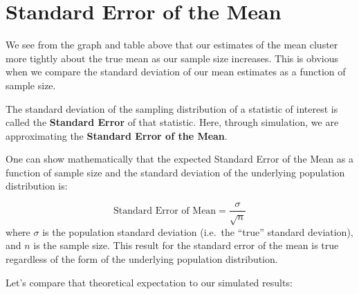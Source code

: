 \documentclass[]{book}
\newenvironment{Shaded}{\begin{snugshade}}{\end{snugshade}}
\newcommand{\CommentTok}[1]{\textcolor[rgb]{0.56,0.35,0.01}{\textit{#1}}}
\newcommand{\DataTypeTok}[1]{\textcolor[rgb]{0.13,0.29,0.53}{#1}}
\newcommand{\KeywordTok}[1]{\textcolor[rgb]{0.13,0.29,0.53}{\textbf{#1}}}
\newcommand{\NormalTok}[1]{#1}
\newcommand{\OperatorTok}[1]{\textcolor[rgb]{0.81,0.36,0.00}{\textbf{#1}}}
\newcommand{\StringTok}[1]{\textcolor[rgb]{0.31,0.60,0.02}{#1}}
\theoremstyle{definition}
\theoremstyle{definition}
\theoremstyle{definition}
\theoremstyle{remark}
\begin{document}
\begin{Shaded}
\end{Shaded}

\hypertarget{standard-error-of-the-mean}{%
\section{Standard Error of the Mean}\label{standard-error-of-the-mean}}

We see from the graph and table above that our estimates of the mean
cluster more tightly about the true mean as our sample size increases.
This is obvious when we compare the standard deviation of our mean
estimates as a function of sample size.

The standard deviation of the sampling distribution of a statistic of
interest is called the \textbf{Standard Error} of that statistic. Here,
through simulation, we are approximating the \textbf{Standard Error of
the Mean}.

One can show mathematically that the expected Standard Error of the Mean
as a function of sample size and the standard deviation of the
underlying population distribution is:

\[
\mbox{Standard Error of Mean} = \frac{\sigma}{\sqrt{n}}
\] where \(\sigma\) is the population standard deviation (i.e.~the
``true'' standard deviation), and \(n\) is the sample size. This result
for the standard error of the mean is true regardless of the form of the
underlying population distribution.

Let's compare that theoretical expectation to our simulated results:
\end{document}
